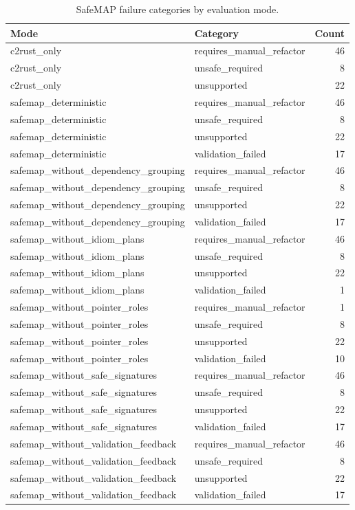 \begin{table}[t]
\centering
\caption{SafeMAP failure categories by evaluation mode.}
\label{tab:safemap-failure-summary}
\begin{tabular}{llr}
\hline
Mode & Category & Count \\
\hline
c2rust\_only & requires\_manual\_refactor & 46 \\
c2rust\_only & unsafe\_required & 8 \\
c2rust\_only & unsupported & 22 \\
safemap\_deterministic & requires\_manual\_refactor & 46 \\
safemap\_deterministic & unsafe\_required & 8 \\
safemap\_deterministic & unsupported & 22 \\
safemap\_deterministic & validation\_failed & 17 \\
safemap\_without\_dependency\_grouping & requires\_manual\_refactor & 46 \\
safemap\_without\_dependency\_grouping & unsafe\_required & 8 \\
safemap\_without\_dependency\_grouping & unsupported & 22 \\
safemap\_without\_dependency\_grouping & validation\_failed & 17 \\
safemap\_without\_idiom\_plans & requires\_manual\_refactor & 46 \\
safemap\_without\_idiom\_plans & unsafe\_required & 8 \\
safemap\_without\_idiom\_plans & unsupported & 22 \\
safemap\_without\_idiom\_plans & validation\_failed & 1 \\
safemap\_without\_pointer\_roles & requires\_manual\_refactor & 1 \\
safemap\_without\_pointer\_roles & unsafe\_required & 8 \\
safemap\_without\_pointer\_roles & unsupported & 22 \\
safemap\_without\_pointer\_roles & validation\_failed & 10 \\
safemap\_without\_safe\_signatures & requires\_manual\_refactor & 46 \\
safemap\_without\_safe\_signatures & unsafe\_required & 8 \\
safemap\_without\_safe\_signatures & unsupported & 22 \\
safemap\_without\_safe\_signatures & validation\_failed & 17 \\
safemap\_without\_validation\_feedback & requires\_manual\_refactor & 46 \\
safemap\_without\_validation\_feedback & unsafe\_required & 8 \\
safemap\_without\_validation\_feedback & unsupported & 22 \\
safemap\_without\_validation\_feedback & validation\_failed & 17 \\
\hline
\end{tabular}
\end{table}

